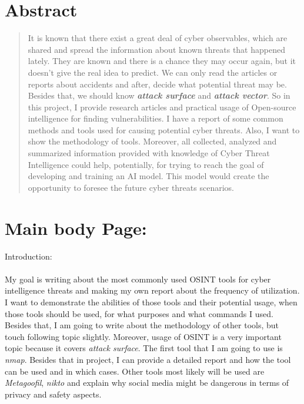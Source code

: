 \documentclass[12pt, letterpaper, twoside]{article}
\begin{document}
\section{\large Abstract}
\begin{abstract}
It is known that there exist a great deal of cyber observables, which are shared and spread the information about known threats that happened lately. They are known and there is a chance they may occur again, but it doesn't give the real idea to predict. We can only read the articles or reports about accidents and after, decide what potential threat may be. Besides that, we should know \textit{\textbf{attack surface}} and \textit{\textbf{attack vector}}\cite{ballmer-scribbr}. So in this project, I provide research articles and practical usage of Open-source intelligence for finding vulnerabilities. I have a report of some common methods and tools used for causing potential cyber threats. Also, I want to show the methodology of tools. Moreover, all collected, analyzed and summarized information provided with knowledge of Cyber Threat Intelligence could help, potentially, for trying to reach the goal of developing and training an AI model. This model would create the opportunity to foresee the future cyber threats scenarios.
\end{abstract}

\newpage

\maketitle

\tableofcontents


\newpage
\section{\large Main body Page:}
{\large Introduction:}\\\\
My goal is writing about the most commonly used OSINT tools for cyber intelligence threats and making my own report about the frequency of utilization. I want to demonstrate the abilities of those tools and their potential usage, when those tools should be used, for what purposes and what commands I used. Besides that, I am going to write about the methodology of other tools, but touch following topic slightly. Moreover, usage of OSINT is a very important topic because it covers \textit{attack surface}. The first tool that I am going to use is \textit{nmap}. Besides that in project, I can provide a detailed report and how the tool can be used and in which cases. Other tools most likely will be used are \textit{Metagoofil}, \textit{nikto} and explain why social media might be dangerous in terms of privacy and safety aspects.  
\end{document}
